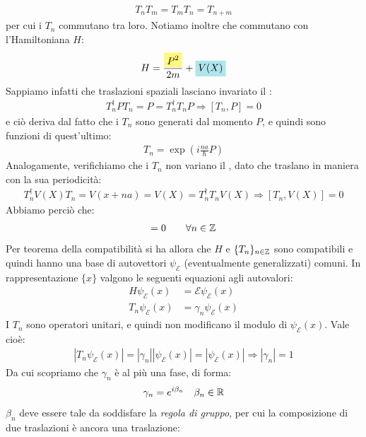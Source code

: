 \documentclass[../../FisicaTeorica.tex]{subfiles}
\begin{document}
\begin{align*}
T_n T_m = T_m T_n = T_{n+m}
\end{align*}
per cui i $T_n$ commutano tra loro. Notiamo inoltre che commutano con l'Hamiltoniana $H$:
\begin{align*}
H = \frac{\hlc{Yellow}{P^2}}{2m} + \hlc{SkyBlue}{V(X)}
\end{align*}
Sappiamo infatti che traslazioni spaziali lasciano invariato il :
\begin{align*}
T_n^\dag P T_n = P = T_n^\dag T_nP \Rightarrow [T_n,P]=0
\end{align*}
e ciò deriva dal fatto che i $T_n$ sono generati dal momento $P$, e quindi sono funzioni di quest'ultimo:
\begin{align*}
T_n = \exp \left( i\frac{na}{\hbar}P \right)
\end{align*}
Analogamente, verifichiamo che i $T_n$ non variano il , dato che traslano in maniera  con la sua periodicità:
\begin{align*}
T_n^\dag V(X) T_n = V(x+na) = V(X) = T_n^\dag T_n V(X) \Rightarrow [T_n,V(X)]=0
\end{align*}
Abbiamo perciò che:
\begin{align*}
[T_n, H] = 0 \qquad \forall n \in \bb{Z}
\end{align*}
Per teorema della compatibilità si ha allora che $H$ e $\{T_n\}_{n\in\mathbb{Z}}$ sono compatibili e quindi hanno una base di autovettori $\psi_\mathcal{E}$ (eventualmente generalizzati) comuni. In rappresentazione $\{x\}$ valgono le seguenti equazioni agli autovalori:
\begin{align*}
H\psi_\mathcal{E}(x) &= \mathcal{E}\psi_\mathcal{E}(x)\\
T_n \psi_\mathcal{E}(x) &= \gamma_n \psi_\mathcal{E}(x)
\end{align*}
I $T_n$ sono operatori unitari, e quindi non modificano il modulo di $\psi_\mathcal{E}(x)$. Vale cioè:
\begin{align*}
|T_n\psi_\mathcal{E}(x)| = |\gamma_n||\psi_\mathcal{E}(x)|=|\psi_\mathcal{E}(x)| \Rightarrow |\gamma_n|=1
\end{align*}
Da cui scopriamo che $\gamma_n$ è al più una fase, di forma:
\begin{align*}
\gamma_n = e^{i\beta_n} \quad \beta_n \in \mathbb{R}
\end{align*}
$\beta_n$ deve essere tale da soddisfare la \textit{regola di gruppo}, per cui la composizione di due traslazioni è ancora una traslazione:
\end{document}
